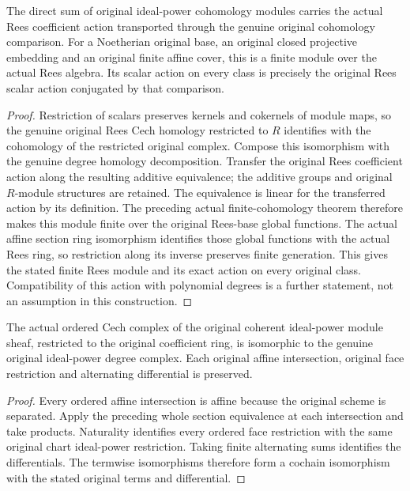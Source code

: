 \begin{lemma}
\label{lem:fc-rees-cech-homology-module}
\leanok
The direct sum of original ideal-power cohomology modules carries the
actual Rees coefficient action transported through the genuine original
cohomology comparison. For a Noetherian original base, an original closed
projective embedding and an original finite affine cover, this is a finite
module over the actual Rees algebra. Its scalar action on every class is
precisely the original Rees scalar action conjugated by that comparison.
\end{lemma}
\begin{proof}
Restriction of scalars preserves kernels and cokernels of module maps,
so the genuine original Rees Cech homology restricted to $R$ identifies
with the cohomology of the restricted original complex. Compose this
isomorphism with the genuine degree homology decomposition. Transfer the
original Rees coefficient action along the resulting additive equivalence;
the additive groups and original $R$-module structures are retained.
The equivalence is linear for the transferred action by its definition.
The preceding actual finite-cohomology theorem therefore makes this
module finite over the original Rees-base global functions. The actual
affine section ring isomorphism identifies those global functions with
the actual Rees ring, so restriction along its inverse preserves finite
generation. This gives the stated finite Rees module and its exact action
on every original class. Compatibility of this action with polynomial
degrees is a further statement, not an assumption in this construction.
\end{proof}

\begin{lemma}
\label{lem:fc-rees-cech-ideal-power-complex}
\notready
The actual ordered Cech complex of the original coherent ideal-power
module sheaf, restricted to the original coefficient ring, is isomorphic
to the genuine original ideal-power degree complex. Each original affine
intersection, original face restriction and alternating differential is
preserved.
\end{lemma}
\begin{proof}
Every ordered affine intersection is affine because the original scheme
is separated. Apply the preceding whole section equivalence at each
intersection and take products. Naturality identifies every ordered
face restriction with the same original chart ideal-power restriction.
Taking finite alternating sums identifies the differentials. The termwise
isomorphisms therefore form a cochain isomorphism with the stated
original terms and differential.
\end{proof}
